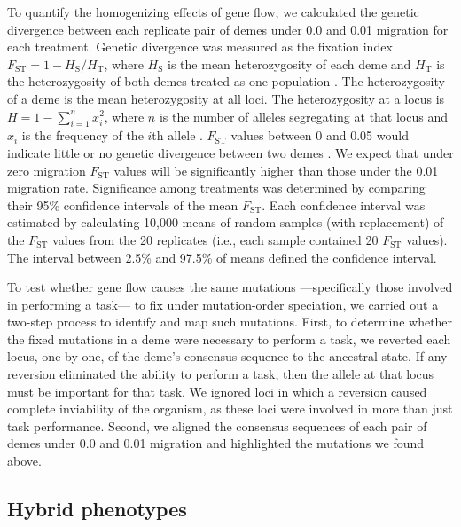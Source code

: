 \begin{doublespace}
To quantify the homogenizing effects of gene flow,
we calculated the genetic divergence
between each replicate pair of demes
under 0.0 and 0.01 migration for each treatment.
%
Genetic divergence was measured as the fixation index
$F_{\mathrm{ST}} = 1 - H_{\mathrm{S}} / H_{\mathrm{T}}$,
where $H_{\mathrm{S}}$ is the mean heterozygosity of each deme
and $H_{\mathrm{T}}$ is the heterozygosity of both demes
treated as one population \citep[p. 118]{har97}.
%
The heterozygosity of a deme
is the mean heterozygosity at all loci.
%
The heterozygosity at a locus is $H = 1 - \sum_{i = 1}^{n} x_i^{2}$,
where $n$ is the number of alleles segregating at that locus
and $x_i$ is the frequency of the $i$th allele \citep[p. 15]{gil04}.
%
$F_{\mathrm{ST}}$ values between 0 and 0.05
would indicate little or no genetic divergence
between two demes \citep[p. 118]{har97}.
%
We expect that under zero migration
$F_{\mathrm{ST}}$ values will be significantly higher
than those under the 0.01 migration rate.
%
Significance among treatments was determined by comparing their
95\% confidence intervals of the mean $F_{\mathrm{ST}}$.
%
Each confidence interval was estimated by calculating 10,000 means
of random samples (with replacement) of the $F_{\mathrm{ST}}$ values
from the 20 replicates
(i.e., each sample contained 20 $F_{\mathrm{ST}}$ values).
%
The interval between 2.5\% and 97.5\% of means defined the confidence interval.



To test whether gene flow causes the same mutations%
---specifically those involved in performing a task---%
to fix under mutation-order speciation,
we carried out a two-step process to identify and map such mutations.
%
First, to determine whether the fixed mutations in a deme
were necessary to perform a task,
we reverted each locus, one by one, of the deme's consensus sequence
to the ancestral state.
%
If any reversion eliminated the ability to perform a task,
then the allele at that locus must be important for that task.
%
We ignored loci in which a reversion caused
complete inviability of the organism,
as these loci were involved in more than just task performance.
%
Second, we aligned the consensus sequences of each pair of demes
under 0.0 and 0.01 migration and highlighted the mutations we found above.



\subsection{Hybrid phenotypes}


\end{doublespace}

